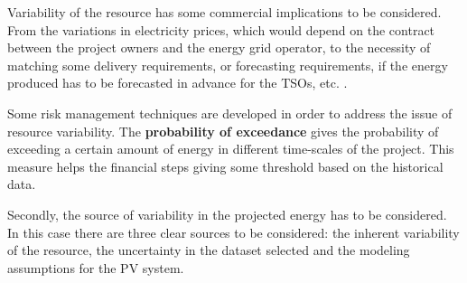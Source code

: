 
Variability of the resource has some commercial implications to be considered. From the variations in electricity prices, which would depend on the contract between the project owners and the energy grid operator, to the necessity of matching some delivery requirements, or forecasting requirements, if the energy produced has to be forecasted in advance for the TSOs, etc. \cite*{MCMAHAN201381}.

Some risk management techniques are developed in order to address the issue of resource variability. The \textbf{probability of exceedance} gives the probability of exceeding a certain amount of energy in different time-scales of the project. This measure helps the financial steps giving some threshold based on the historical data.

Secondly, the source of variability in the projected energy has to be considered. In this case there are three clear sources to be considered: the inherent variability of the resource, the uncertainty in the dataset selected and the modeling assumptions for the PV system.

 




